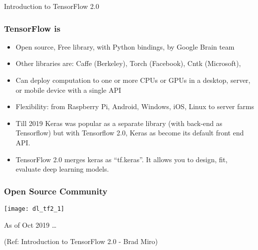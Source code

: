 \begin{frame}
  \begin{center}
    {\Large Introduction to TensorFlow 2.0}
  \end{center}
\end{frame}


\begin{frame}[fragile] \frametitle{TensorFlow is}
\begin{itemize}
\item Open source, Free library, with Python bindings, by Google Brain team
\item Other libraries are: Caffe (Berkeley), Torch (Facebook), Cntk (Microsoft),
\item Can deploy computation to one or more CPUs or GPUs in a desktop, server, or mobile device with a single API
\item Flexibility: from Raspberry Pi, Android, Windows, iOS, Linux to server farms
\item Till 2019 Keras was popular as a separate library  (with back-end as Tensorflow) but with Tensorflow 2.0, Keras as become its default front end API.
\item TensorFlow 2.0 merges keras as ``tf.keras''. It allows you to design, fit, evaluate deep learning models.
\end{itemize}
\end{frame}



\begin{frame}[fragile] \frametitle{Open Source Community}

\begin{center}
\texttt{[image: dl\_tf2\_1]}
\end{center}

As of Oct 2019 \ldots

\tiny{(Ref: Introduction to TensorFlow 2.0 - Brad Miro)}
\end{frame}

